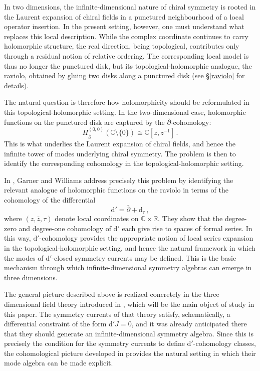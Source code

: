 \documentclass[11pt]{amsart}
\newcommand{\R}{{\mathbb R}}
\newcommand{\C}{{\mathbb C}}
\numberwithin{equation}{section}
\numberwithin{figure}{section}
\numberwithin{table}{section}
\renewcommand{\d}{\mathrm{d}}
\theoremstyle{thm}
\numberwithin{equation}{subsection}
\theoremstyle{definition}
\theoremstyle{rem}
\begin{document}
In two dimensions, the infinite-dimensional nature of chiral symmetry is rooted in the Laurent expansion of chiral fields in a punctured neighbourhood of a local operator insertion. In the present setting, however, one must understand what replaces this local description. While the complex coordinate continues to carry holomorphic structure, the real direction, being topological, contributes only through a residual notion of relative ordering. The corresponding local model is thus no longer the punctured disk, but its topological-holomorphic analogue, the raviolo, obtained by gluing two disks along a punctured disk (see \S \ref{raviolo} for details).

The natural question is therefore how holomorphicity should be reformulated in this topological-holomorphic setting. In the two-dimensional case, holomorphic functions on the punctured disk are captured by the $\bar\partial$-cohomology:
\begin{equation}
H^{(0,0)}_{\bar\partial}(\mathbb C\setminus\{0\}) \cong \mathbb C[z,z^{-1}] \, .
\end{equation}
This is what underlies the Laurent expansion of chiral fields, and hence the infinite tower of modes underlying chiral symmetry. The problem is then to identify the corresponding cohomology in the topological-holomorphic setting.

In \cite{Garner:2023zqn}, Garner and Williams address precisely this problem by identifying the relevant analogue of holomorphic functions on the raviolo in terms of the cohomology of the differential
\begin{equation}
    \mathrm{d}' = \bar{\partial} + \mathrm{d}_\tau \,,
\end{equation}
where $(z,\bar z,\tau)$ denote local coordinates on $\C\times \R$. They show that the degree-zero and degree-one cohomology of $\mathrm d'$ each give rise to spaces of formal series. In this way, $\mathrm d'$-cohomology provides the appropriate notion of local series expansion in the topological-holomorphic setting, and hence the natural framework in which the modes of $\mathrm d'$-closed symmetry currents may be defined. This is the basic mechanism through which infinite-dimensional symmetry algebras can emerge in three dimensions.

The general picture described above is realized concretely in the three dimensional field theory introduced in \cite{Chen:2024axr}, which will be the main object of study in this paper. The symmetry currents of that theory satisfy, schematically, a differential constraint of the form 
$\d'J=0$, and it was already anticipated there that they should generate an infinite-dimensional symmetry algebra. Since this is precisely the condition for the symmetry currents to define 
$\d'$-cohomology classes, the cohomological picture developed in \cite{Garner:2023zqn} provides the natural setting in which their mode algebra can be made explicit.
\end{document}
